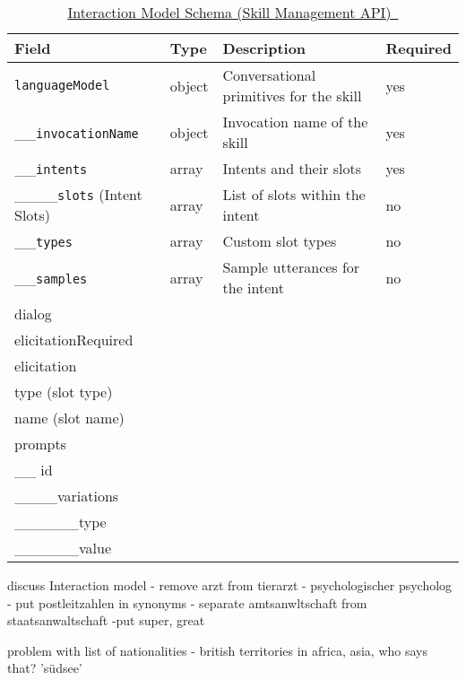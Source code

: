 \begin{table}[h]
	\caption[Interaction Model Schema]{\href{https://developer.amazon.com/docs/smapi/interaction-model-schema.html}{Interaction Model Schema (Skill Management API)~\cite{alexaDesignGuide} }}\label{interactionModel}
	\begin{tabularx}{\textwidth}{|l | l l l | }
		Field	&	Type	&	Description		&	Required \\ \hline
		\lstinline|languageModel| &	object	& Conversational primitives for the skill	& yes\\
		\_\_\lstinline|invocationName| &	object	& Invocation name of the skill	& yes\\
		\_\_\lstinline|intents| &	array	& Intents and their slots	& yes\\
		\_\_\_\_\lstinline|slots| (Intent Slots) & array & List of slots within the intent	& no\\
		\_\_\lstinline|types| &	array	& Custom slot types		& no\\
		\_\_\lstinline|samples|	& array	 & Sample utterances for the intent	& no\\
		
		dialog & & & \\
		elicitationRequired & & & \\
		elicitation & & & \\
		type (slot type) & & & \\
		name (slot name) & & & \\
		
		prompts & & & \\
		\_\_ id  & & & \\
		\_\_\_\_variations  & & & \\
		\_\_\_\_\_\_type  & & & \\
		\_\_\_\_\_\_value  & & & \\ \hline
		
	\end{tabularx}			
\end{table}

discuss  Interaction model
- remove arzt from tierarzt
- psychologischer psycholog
- put postleitzahlen in synonyms
- separate amtsanwltschaft from staatsanwaltschaft 
-put super, great

problem with list of nationalities - british territories in africa, asia, who says that? 'südsee'





